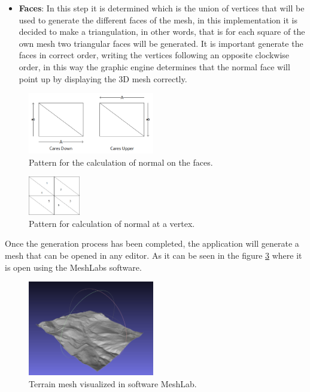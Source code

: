 \documentclass[10pt,a4paper,twocolumn,twoside]{article}
\begin{document}
\begin{itemize}
  \item \textbf{Faces}: In this step it is determined which is the union of vertices that will be used to generate the different faces of the mesh, in this implementation it is decided to make a triangulation, in other words, that is for each square of the own mesh two triangular faces will be generated. It is important generate the faces in correct order, writing the vertices following an opposite clockwise order, in this way the graphic engine determines that the normal face will point up by displaying the 3D mesh correctly.
\end{itemize}

\begin{figure}[!h]
\centering
  	\includegraphics[width=0.49\textwidth]{caranormal}
	\caption{Pattern for the calculation of normal on the faces.}
	\label{fig-normalcara}
\end{figure}

\begin{figure}[!h]
\centering
  	\includegraphics[width=0.2\textwidth]{vertexnormal}
	\caption{Pattern for calculation of normal at a vertex.}
	\label{fig-normalvertex}
\end{figure}

Once the generation process has been completed, the application will generate a mesh that can be opened in any editor. As it can be seen in the figure \ref{fig-meshlab} where it is open using the MeshLabs software.

\begin{figure}[!h]
\centering
  	\includegraphics[width=0.49\textwidth]{mesh_example_meshlab}
	\caption{Terrain mesh visualized in software MeshLab.}
	\label{fig-meshlab}
\end{figure}
\end{document}
